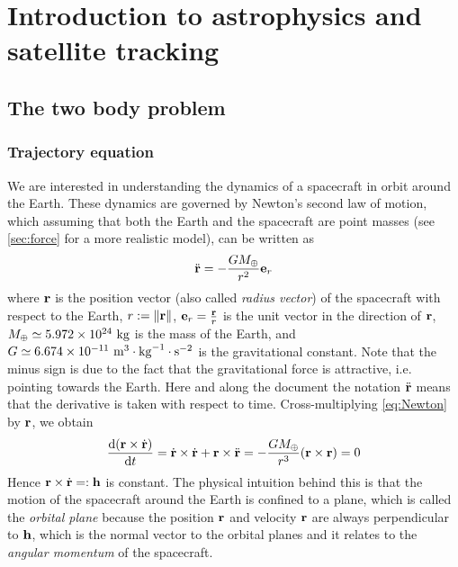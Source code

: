 \documentclass[../main.tex]{subfiles}
\begin{document}
\section{Introduction to astrophysics and satellite tracking}
\subsection{The two body problem}\label{sec:twoBody}
\subsubsection{Trajectory equation}
We are interested in understanding the dynamics of a spacecraft in orbit around the Earth. These dynamics are governed by Newton's second law of motion, which assuming that both the Earth and the spacecraft are point masses (see \cref{sec:force} for a more realistic model), can be written as
\begin{equation}
  \label{eq:Newton}
  \ddot{\boldsymbol{\mathrm{r}}}=-\frac{GM_{\oplus}}{r^2}\boldsymbol{\mathrm{e}}_r
\end{equation}
where $\boldsymbol{\mathrm{r}}$ is the position vector (also called \emph{radius vector}) of the spacecraft with respect to the Earth, $r:=\left\|\boldsymbol{\mathrm{r}}\right\|$, $\boldsymbol{\mathrm{e}}_r=\frac{\boldsymbol{\mathrm{r}}}{r}$ is the unit vector in the direction of $\boldsymbol{\mathrm{r}}$, $M_{\oplus}\simeq 5.972\times 10^{24}\ \kg$ is the mass of the Earth, and $G\simeq 6.674\times 10^{-11}\ \mathrm{m}^3\cdot \mathrm{kg}^{-1}\cdot\mathrm{s}^{-2}$ is the gravitational constant. Note that the minus sign is due to the fact that the gravitational force is attractive, i.e. pointing towards the Earth.
Here and along the document the notation $\ddot{\boldsymbol{\mathrm{r}}}$ means that the derivative is taken with respect to time.
Cross-multiplying \cref{eq:Newton} by $\boldsymbol{\mathrm{r}}$, we obtain
\begin{equation}
  \dv{(\boldsymbol{\mathrm{r}}\times \dot{\boldsymbol{\mathrm{r}}})}{t}=\dot{\boldsymbol{\mathrm{r}}}\times \dot{\boldsymbol{\mathrm{r}}}+\boldsymbol{\mathrm{r}}\times\ddot{\boldsymbol{\mathrm{r}}}=-\frac{GM_{\oplus}}{r^3}(\boldsymbol{\mathrm{r}}\times \boldsymbol{\mathrm{r}})=0
\end{equation}
Hence $\boldsymbol{\mathrm{r}}\times \dot{\boldsymbol{\mathrm{r}}}=:\boldsymbol{\mathrm{h}}$ is constant. The physical intuition behind this is that the motion of the spacecraft around the Earth is confined to a plane, which is called the \emph{orbital plane} because the position $\boldsymbol{\mathrm{r}}$ and velocity $\boldsymbol{\mathrm{r}}$ are always perpendicular to $\boldsymbol{\mathrm{h}}$, which is the normal vector to the orbital planes and it relates to the \emph{angular momentum} of the spacecraft.
\end{document}
